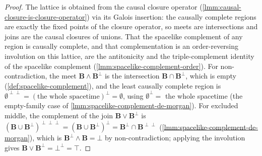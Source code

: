 \begin{proof}
    \leanok
    The lattice is obtained from the causal closure operator (\ref{lmm:causal-closure-is-closure-operator}) via its Galois insertion: the causally complete regions are exactly the fixed points of the closure operator, so meets are intersections and joins are the causal closures of unions. That the spacelike complement of any region is causally complete, and that complementation is an order-reversing involution on this lattice, are the antitonicity and the triple-complement identity of the spacelike complement (\ref{lmm:spacelike-complement-order}). For non-contradiction, the meet $\mathbf{B} \wedge \mathbf{B}^\perp$ is the intersection $\mathbf{B} \cap \mathbf{B}^\perp$, which is empty (\ref{def:spacelike-complement}), and the least causally complete region is $\emptyset^{\perp\perp} = (\text{the whole spacetime})^\perp = \emptyset$, using $\emptyset^\perp = $ the whole spacetime (the empty-family case of \ref{lmm:spacelike-complement-de-morgan}). For excluded middle, the complement of the join $\mathbf{B} \vee \mathbf{B}^\perp$ is $(\mathbf{B} \cup \mathbf{B}^\perp)^{\perp\perp\perp} = (\mathbf{B} \cup \mathbf{B}^\perp)^\perp = \mathbf{B}^\perp \cap \mathbf{B}^{\perp\perp}$ (\ref{lmm:spacelike-complement-de-morgan}), which is $\mathbf{B}^\perp \wedge \mathbf{B} = \bot$ by non-contradiction; applying the involution gives $\mathbf{B} \vee \mathbf{B}^\perp = \bot^\perp = \top$.
\end{proof}

\medskip

